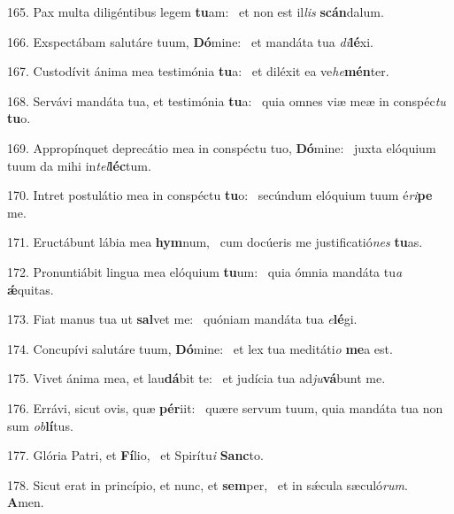 165. Pax multa diligéntibus legem \textbf{tu}am: \ast\  et non est il\textit{lis} \textbf{scán}dalum.\

166. Exspectábam salutáre tuum, \textbf{Dó}mine: \ast\  et mandáta tua \textit{di}\textbf{lé}xi.\

167. Custodívit ánima mea testimónia \textbf{tu}a: \ast\  et diléxit ea ve\textit{he}\textbf{mén}ter.\

168. Servávi mandáta tua, et testimónia \textbf{tu}a: \ast\  quia omnes viæ meæ in conspéc\textit{tu} \textbf{tu}o.\

169. Appropínquet deprecátio mea in conspéctu tuo, \textbf{Dó}mine: \ast\  juxta elóquium tuum da mihi in\textit{tel}\textbf{léc}tum.\

170. Intret postulátio mea in conspéctu \textbf{tu}o: \ast\  secúndum elóquium tuum é\textit{ri}\textbf{pe} me.\

171. Eructábunt lábia mea \textbf{hym}num, \ast\  cum docúeris me justificatió\textit{nes} \textbf{tu}as.\

172. Pronuntiábit lingua mea elóquium \textbf{tu}um: \ast\  quia ómnia mandáta tu\textit{a} \textbf{ǽ}quitas.\

173. Fiat manus tua ut \textbf{sal}vet me: \ast\  quóniam mandáta tua \textit{e}\textbf{lé}gi.\

174. Concupívi salutáre tuum, \textbf{Dó}mine: \ast\  et lex tua meditáti\textit{o} \textbf{me}a est.\

175. Vivet ánima mea, et lau\textbf{dá}bit te: \ast\  et judícia tua ad\textit{ju}\textbf{vá}bunt me.\

176. Errávi, sicut ovis, quæ \textbf{pér}iit: \ast\  quære servum tuum, quia mandáta tua non sum \textit{ob}\textbf{lí}tus.\

177. Glória Patri, et \textbf{Fí}lio, \ast\  et Spirítu\textit{i} \textbf{Sanc}to.\

178. Sicut erat in princípio, et nunc, et \textbf{sem}per, \ast\  et in sǽcula sæculó\textit{rum}. \textbf{A}men.\

